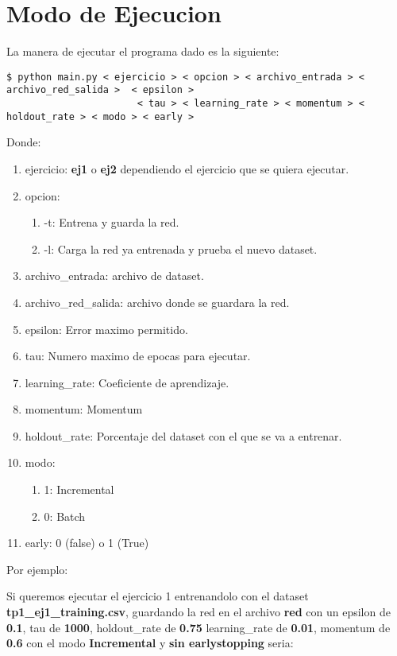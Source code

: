 \section{Modo de Ejecucion}

La manera de ejecutar el programa dado es la siguiente:


\begin{verbatim}
$ python main.py < ejercicio > < opcion > < archivo_entrada > < archivo_red_salida >  < epsilon > 
                       < tau > < learning_rate > < momentum > < holdout_rate > < modo > < early >
\end{verbatim}

Donde:

\begin{enumerate}
\item ejercicio: \textbf{ej1} o \textbf{ej2} dependiendo el ejercicio que se quiera ejecutar.
\item opcion: 
\begin{enumerate}
\item -t: Entrena y guarda la red.
\item -l: Carga la red ya entrenada y prueba el nuevo dataset.
\end{enumerate}
\item archivo\_entrada: archivo de dataset.
\item archivo\_red\_salida: archivo donde se guardara la red.
\item epsilon: Error maximo permitido.
\item tau: Numero maximo de epocas para ejecutar.
\item learning\_rate: Coeficiente de aprendizaje.
\item momentum: Momentum
\item holdout\_rate: Porcentaje del dataset con el que se va a entrenar.
\item modo: 
\begin{enumerate}
\item 1: Incremental
\item 0: Batch
\end{enumerate}
\item early: 0 (false) o 1 (True)
\end{enumerate}


Por ejemplo: 

Si queremos ejecutar el ejercicio 1 entrenandolo con el dataset \textbf{tp1\_ej1\_training.csv}, guardando la red en el archivo 
\textbf{red} con un epsilon de \textbf{0.1}, tau de \textbf{1000}, holdout\_rate de \textbf{0.75} learning\_rate de \textbf{0.01}, momentum de \textbf{0.6} con el modo \textbf{Incremental} y \textbf{sin earlystopping} seria:

